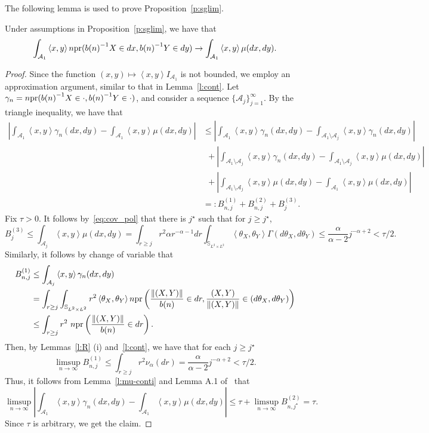 \documentclass[lineno]{biometrika}
\newcommand \ag{\alpha}
\newcommand \ga{\gamma}
\newcommand \Gg{\Gamma}
\newcommand{\thg}{\theta}%
\newcommand\mbS{{\mathbb S}}
\newcommand\cA{{\mathcal A}}
\newcommand\lp{\left (}
\newcommand\rp{\right )}
\newcommand\lip{\left \langle}
\newcommand\rip{\right \rangle}
\begin{document}
The following lemma is used to prove Proposition~\ref{p:sglim}.

\begin{lemma} \label{l:cont_m0}
Under assumptions in Proposition~\ref{p:sglim}, we have that
\[
\int_{\cA_1} \lip x,y\rip n{\rm pr}({b(n)}^{-1}X \in dx, {b(n)}^{-1}Y \in dy) 
\to \int_{\cA_1} \lip x,y\rip \mu(dx, dy).
\]
\end{lemma}

\begin{proof}
Since the function $(x,y)\mapsto \lip x,y\rip I_{\cA_1}$ 
is not bounded, we employ an approximation argument, 
similar to that in Lemma~\ref{l:cont}. Let $\ga_n = n{\rm pr}({b(n)}^{-1}X \in \cdot, {b(n)}^{-1}Y \in \cdot)$, and consider a sequence $\{\cA_j\}_{j=1}^{\infty}$. By the triangle inequality, we have that
\begin{align*}
\left | \int_{\cA_1} \lip x,y\rip \ga_n(dx,dy) - \int_{\cA_1} \lip x,y\rip \mu(dx,dy)\right |
&\le  \left | \int_{\cA_1} \lip x,y\rip  \ga_n(dx,dy) - \int_{\cA_1 \setminus \cA_j} \lip x,y\rip  \ga_n (dx,dy)\right |\\
& \ \ +
\left | \int_{\cA_1 \setminus \cA_j} \lip x,y\rip  \ga_n (dx,dy)  - \int_{\cA_1 \setminus \cA_j} \lip x,y\rip  \mu  (dx,dy)\right |\\
& \ \ +
\left | \int_{\cA_1 \setminus \cA_j} \lip x,y\rip  \mu  (dx,dy)  - \int_{\cA_1} \lip x,y\rip  \mu(dx,dy)\right |\\
&=: B_{n, j}^{(1)} + B_{n, j}^{(2)} + B_{j}^{(3)}.
\end{align*}
Fix $\tau > 0$. It follows by~\eqref{eq:cov_pol} that there is $j^\star$ such that for $j \ge j^\star$,
\[
B_{j}^{(3)} \le \int_{\cA_j} \lip x,y\rip \mu(dx,dy) = \int_{r \ge j} r^2 \ag r^{-\ag-1} dr
\int_{\mbS_{L^2 \times L^2}} \lip \thg_X, \thg_Y \rip \Gg (d\thg_X,d\thg_Y) \le \frac{\ag}{\ag-2}j^{-\ag+2} < \tau/2.
\]
Similarly, it follows by change of variable that
\begin{align*}
B_{n, j}^{(1)} &\le \int_{\cA_j} \lip x,y\rip \ga_n(dx,dy) \\
&=  \int_{r \ge j}  \int_{\mbS_{L^2 \times L^2}}  r^2
\lip \thg_X, \thg_Y \rip n{\rm pr} \lp \frac{\|(X,Y)\|}{b(n)} \in dr, \frac{(X,Y)}{\|(X,Y)\|} \in (d\thg_X, d\thg_Y)\rp \\
& \le \int_{r \ge j} r^2 \ n{\rm pr} \lp \frac{\|(X,Y)\|}{b(n)} \in dr \rp.
\end{align*}
Then, by Lemmas~\ref{l:R} (i) and~\ref{l:cont}, we have that for each 
 $j \ge j^\star$
\[
\limsup_{n\to\infty} B_{n, j}^{(1)} \le  \int_{r \ge j} r^2 \nu_{\ag}(dr) = \frac{\ag}{\ag-2}j^{-\ag+2} < \tau/2.
\]
Thus, it follows from Lemma~\ref{l:mu-conti} and Lemma A.1 of~\citet{meinguet:segers:2010} that
\[
\limsup_{n\to\infty}
\left | \int_{\cA_1} \lip x,y\rip \ga_n(dx,dy) - \int_{\cA_1} \lip x,y\rip \mu(dx,dy)\right |
\le  \tau + \limsup_{n\to\infty} B_{n, j^\star}^{(2)} = \tau.
\]
Since $\tau$ is arbitrary, we get the claim.
\end{proof}
\end{document}
